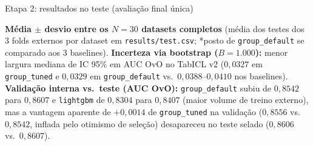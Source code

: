 \documentclass[aspectratio=169,11pt]{beamer}
\begin{document}
\begin{frame}{Etapa 2: resultados no teste (avaliação final única)}
    \scriptsize
    \centering
    \\[0.4em]
    \footnotesize \raggedright
    \textbf{Média $\pm$ desvio entre os $N = 30$ datasets completos} (média dos testes dos 3 folds externos por dataset em \texttt{results/test.csv}; *posto de \texttt{group\_default} se comparado aos 3 baselines). \textbf{Incerteza via bootstrap ($B=1.000$):} menor largura mediana de IC 95\% em AUC OvO no TabICL v2 (\textbf{$0{,}0327$} em \texttt{group\_tuned} e \textbf{$0{,}0329$} em \texttt{group\_default} vs.\ $0{,}0388\text{--}0{,}0410$ nos baselines).\\
    \textbf{Validação interna vs.\ teste (AUC OvO):} \texttt{group\_default} subiu de $0{,}8542$ para $0{,}8607$ e \texttt{lightgbm} de $0{,}8304$ para $0{,}8407$ (maior volume de treino externo), mas a vantagem aparente de $+0{,}0014$ de \texttt{group\_tuned} na validação ($0{,}8556$ vs.\ $0{,}8542$, inflada pelo otimismo de seleção) desapareceu no teste selado ($0{,}8606$ vs.\ $0{,}8607$).
\end{frame}
\end{document}
